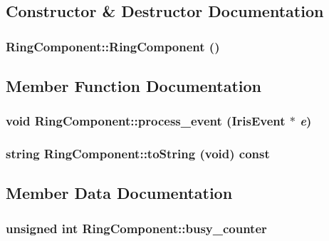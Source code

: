 \subsection{Constructor \& Destructor Documentation}
\hypertarget{classRingComponent_b1ac3deb3f376e139df8ef4297546ff7}{
\subsubsection[{RingComponent}]{\setlength{\rightskip}{0pt plus 5cm}RingComponent::RingComponent ()}}
\label{classRingComponent_b1ac3deb3f376e139df8ef4297546ff7}




\subsection{Member Function Documentation}
\hypertarget{classRingComponent_8d5e430edd1b65b4668d7809a4c9b786}{
\subsubsection[{process\_\-event}]{\setlength{\rightskip}{0pt plus 5cm}void RingComponent::process\_\-event ({\bf IrisEvent} $\ast$ {\em e})}}
\label{classRingComponent_8d5e430edd1b65b4668d7809a4c9b786}


\hypertarget{classRingComponent_e042ce6bbff686ce85ef6b4d09336932}{
\subsubsection[{toString}]{\setlength{\rightskip}{0pt plus 5cm}string RingComponent::toString (void) const}}
\label{classRingComponent_e042ce6bbff686ce85ef6b4d09336932}




\subsection{Member Data Documentation}
\hypertarget{classRingComponent_71558da628a1c33a5f9c3e3da5d57b91}{
\subsubsection[{busy\_\-counter}]{\setlength{\rightskip}{0pt plus 5cm}unsigned int {\bf RingComponent::busy\_\-counter}}}
\label{classRingComponent_71558da628a1c33a5f9c3e3da5d57b91}


